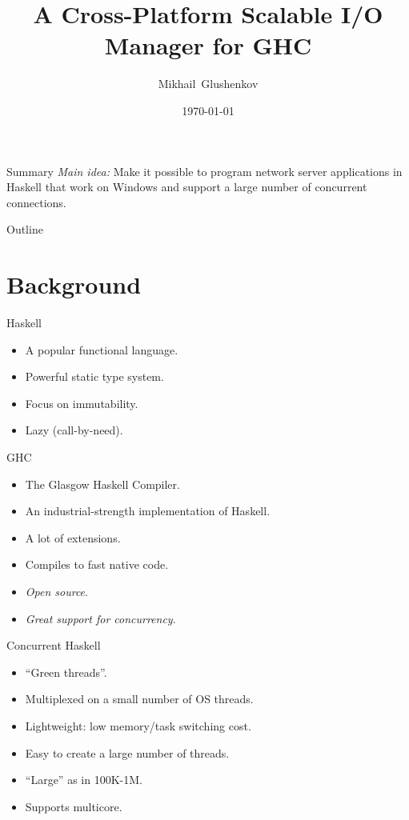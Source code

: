 \documentclass{beamer}
\title{A Cross-Platform Scalable I/O Manager for GHC}
\author{Mikhail~Glushenkov}
\date{\today}
\begin{document}
\begin{frame}
  \titlepage
\end{frame}

\begin{frame}{Summary}
  \emph{Main idea:} Make it possible to program network server applications in
  Haskell that work on Windows and support a large number of concurrent
  connections.
\end{frame}

\begin{frame}{Outline}
  \tableofcontents
\end{frame}

\section {Background}

\begin{frame}{Haskell}
  \begin{itemize}
  \item A popular functional language.
  \item Powerful static type system.
  \item Focus on immutability.
  \item Lazy (call-by-need).
  \end{itemize}
\end{frame}

\begin{frame}{GHC}
  \begin{itemize}
  \item The Glasgow Haskell Compiler.
  \item An industrial-strength implementation of Haskell.
  \item A lot of extensions.
  \item Compiles to fast native code.
  \item \emph{Open source}.
  \item \emph{Great support for concurrency}.
  \end{itemize}
\end{frame}

\begin{frame}{Concurrent Haskell}
  \begin{itemize}
  \item ``Green threads''.
  \item Multiplexed on a small number of OS threads.
  \item Lightweight: low memory/task switching cost.
  \item Easy to create a large number of threads.
  \item ``Large'' as in 100K-1M.
  \item Supports multicore.
  \end{itemize}
\end{frame}
\end{document}
